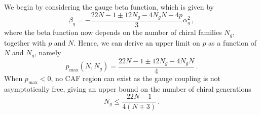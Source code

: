 We begin by considering the gauge beta function, which is given by
\begin{equation}
    \beta_g=-\frac{22N-1\pm 12 N_g-4N_gN -4p}{3}\alpha_g^2\,,
\end{equation}
where the beta function now depends on the number of chiral families $N_g$, together with $p$ and $N$. Hence, we can derive an upper limit on $p$ as a function of $N$ and $N_g$, namely
\begin{equation} \label{eq:pmaxfundNg}
    p_{\max} (N,N_g) = \frac{22N-1\pm12N_g-4N_g N}{4}\,.
\end{equation}
When $p_{\max} < 0$, no CAF region can exist as the gauge coupling is not asymptotically free, giving an upper bound on the number of chiral generations
\begin{equation}
    N_{g} \leq \frac{22N-1}{4(N\mp 3)}\,. 
\end{equation}
